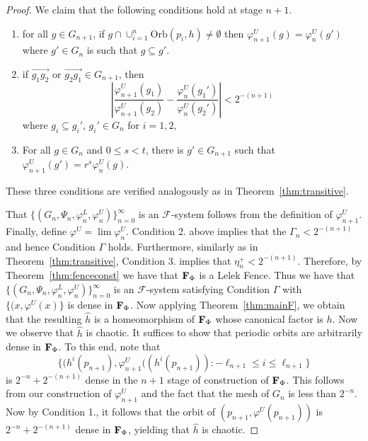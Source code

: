 \documentclass[11pt]{amsart}
\newcommand{\oa}{\overrightarrow}
\newcommand{\orb}{{\mathrm{Orb}}}
\newcommand{\fence}{{\bf F}_{\Phi}{}}
\newcommand{\cF}{\mathcal{F}}
\newcommand{\fsystem}{\{(G_n, \Psi_n,\varphi^L_n,\varphi^U_n)\}_{n=0}^{\infty}}
\begin{document}
{\begin{proof}
      We claim that the following conditions hold at stage $n+1$. 
    \begin{enumerate}
        \item for all $ g\in G_{n+1}$, if $g\cap \cup^{n}_{i=1}\orb(p_i,h)\neq \emptyset$ then $\varphi^U_{n+1}(g) = \varphi^U_{n}(g') $
        where $g' \in G_n$ is such that $g \subseteq g'$.
        \item if $\oa{g_1g_2}$ or  $\oa{g_2g_1}\in G_{n+1}$, then 
        \[  \left | \frac{\varphi^U_{n+1}(g_1)}{\varphi^U_{n+1}(g_2)}  -\frac{\varphi^U_n(g_1')}{\varphi^U_n(g_2')}\right | < 2^{-(n+1)}
        \]
        where $g_i \subseteq g_i'$, $g_i' \in G_n$ for $i=1,2$,

        \item For all $g \in G_n$ and $ 0\le s < t$, there is $g' \in G_{n+1}$ such that $\varphi^U_{n+1} (g')=r^s\varphi^U_n(g)$.
  
    \end{enumerate}

These three conditions are verified analogously as in Theorem~\ref{thm:transitive}.    

That $\fsystem$ is an $\cF$-system follows from the definition of $\varphi^U_{n+1}$. 
Finally, define $\varphi^U = \lim \varphi^U_n$. Condition 2. above implies that the $\Gamma_n < 2^{-(n+1)}$ and hence  Condition $\Gamma$ holds. Furthermore, similarly as in Theorem~\ref{thm:transitive}, Condition 3. implies that $\eta^+_n < 2^{-(n+1)}$. Therefore, by Theorem~\ref{thm:fenceconst} we have that $\fence$ is a Lelek Fence. Thus we have that  $\fsystem$ is an $\cF$-system satisfying Condition $\Gamma$ with $\{(x, \varphi^U(x)\}$ is dense in $\fence$.
Now applying Theorem~\ref{thm:mainF}, we obtain that the resulting $\hat{h}$ is a homeomorphism of $\fence$ whose canonical factor is $h$. Now we observe that $\hat h$ is chaotic. It suffices to show that periodic orbits are arbitrarily dense in $\fence$. To this end, note that \[
\{(h^{i}(p_{n+1}), \varphi^U_{n+1}((h^{i}(p_{n+1})): -\ell_{n+1} \le i \le \ell_{n+1} \}\] is $2^{-n}+ 2^{-(n+1)}$ dense in the $n+1$ stage of construction of $\fence$. This follows from our construction of $\varphi^U_{n+1}$ and the fact that the mesh of $G_n$ is less than $2^{-n}$.
Now by Condition 1., it follows that the orbit of $(p_{n+1}, \varphi^U(p_{n+1}))$ is $2^{-n}+ 2^{-(n+1)}$ 
dense in $\fence$, yielding that $\hat{h}$ is chaotic.
    \end{proof}

}
\end{document}
